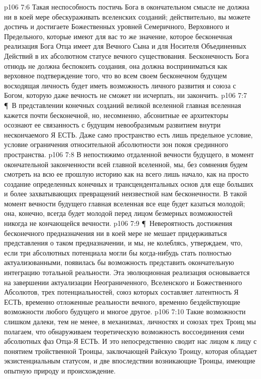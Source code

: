 \vs p106 7:6 Такая неспособность постичь Бога в окончательном смысле не должна ни в коей мере обескураживать вселенских созданий; действительно, вы можете достичь и достигаете Божественных уровней Семеричного, Верховного и Предельного, которые имеют для вас то же значение, которое бесконечная реализация Бога Отца имеет для Вечного Сына и для Носителя Объединенных Действий в их абсолютном статусе вечного существования. Бесконечность Бога отнюдь не должна беспокоить создания, она должна восприниматься как верховное подтверждение того, что во всем своем бесконечном будущем восходящая личность будет иметь возможность личного развития и союза с Богом, которую даже вечность не сможет ни исчерпать, ни закончить.
\vs p106 7:7 \P\ В представлении конечных созданий великой вселенной главная вселенная кажется почти бесконечной, но, несомненно, абсонитные ее архитекторы осознают ее связанность с будущим невообразимым развитием внутри нескончаемого Я ЕСТЬ. Даже само пространство есть лишь предельное условие, условие ограничения  относительной абсолютности зон покоя срединного пространства.
\vs p106 7:8 В непостижимо отдаленной вечности будущего, в момент окончательной законченности всей главной вселенной, мы, без сомнения будем смотреть на всю ее прошлую историю как на всего лишь начало, как на просто создание определенных конечных и трансцендентальных основ для еще больших и более захватывающих превращений неизвестной нам бесконечности. В такой момент вечности будущего главная вселенная все еще будет казаться молодой; она, конечно, всегда будет молодой перед лицом безмерных возможностей никогда не кончающейся вечности.
\vs p106 7:9 \P\ Невероятность достижения бесконечного предназначения ни в коей мере не мешает придерживаться представления о таком предназначении, и мы, не колеблясь, утверждаем, что, если три абсолютных потенциала могли бы когда\hyp{}нибудь стать полностью актуализованными, появилась бы возможность представить окончательную интеграцию тотальной реальности. Эта эволюционная реализация основывается на завершении актуализации Неограниченного, Вселенского и Божественного Абсолютов, трех потенциальностей, союз которых составляет латентность Я ЕСТЬ, временно отложенные реальности вечного, временно бездействующие возможности любого будущего и многое другое.
\vs p106 7:10 Такие возможности слишком далеки, тем не менее, в механизмах, личностях и союзах трех Троиц мы полагаем, что обнаруживаем теоретическую возможность воссоединения семи абсолютных фаз Отца\hyp{}Я ЕСТЬ. И это непосредственно сводит нас лицом к лицу с понятием тройственной Троицы, заключающей Райскую Троицу, которая обладает экзистенциальным статусом, и две впоследствии возникающие Троицы, имеющие опытную природу и происхождение.
